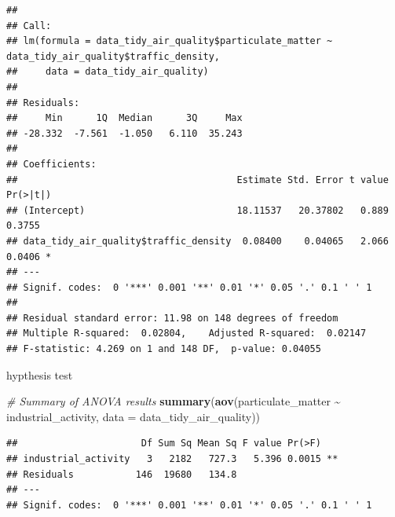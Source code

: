 \documentclass[12pt,halfline,a4paper,]{ouparticle}
\newenvironment{Shaded}{\begin{snugshade}}{\end{snugshade}}
\newcommand{\AttributeTok}[1]{\textcolor[rgb]{0.13,0.29,0.53}{#1}}
\newcommand{\CommentTok}[1]{\textcolor[rgb]{0.56,0.35,0.01}{\textit{#1}}}
\newcommand{\FunctionTok}[1]{\textcolor[rgb]{0.13,0.29,0.53}{\textbf{#1}}}
\newcommand{\NormalTok}[1]{#1}
\newcommand{\SpecialCharTok}[1]{\textcolor[rgb]{0.81,0.36,0.00}{\textbf{#1}}}
\begin{document}
\begin{verbatim}
## 
## Call:
## lm(formula = data_tidy_air_quality$particulate_matter ~ data_tidy_air_quality$traffic_density, 
##     data = data_tidy_air_quality)
## 
## Residuals:
##     Min      1Q  Median      3Q     Max 
## -28.332  -7.561  -1.050   6.110  35.243 
## 
## Coefficients:
##                                       Estimate Std. Error t value Pr(>|t|)  
## (Intercept)                           18.11537   20.37802   0.889   0.3755  
## data_tidy_air_quality$traffic_density  0.08400    0.04065   2.066   0.0406 *
## ---
## Signif. codes:  0 '***' 0.001 '**' 0.01 '*' 0.05 '.' 0.1 ' ' 1
## 
## Residual standard error: 11.98 on 148 degrees of freedom
## Multiple R-squared:  0.02804,    Adjusted R-squared:  0.02147 
## F-statistic: 4.269 on 1 and 148 DF,  p-value: 0.04055
\end{verbatim}

hypthesis test

\begin{Shaded}
\begin{Highlighting}[]
\CommentTok{\# Summary of ANOVA results}
\FunctionTok{summary}\NormalTok{(}\FunctionTok{aov}\NormalTok{(particulate\_matter }\SpecialCharTok{\textasciitilde{}}\NormalTok{ industrial\_activity, }\AttributeTok{data =}\NormalTok{ data\_tidy\_air\_quality))}
\end{Highlighting}
\end{Shaded}

\begin{verbatim}
##                      Df Sum Sq Mean Sq F value Pr(>F)   
## industrial_activity   3   2182   727.3   5.396 0.0015 **
## Residuals           146  19680   134.8                  
## ---
## Signif. codes:  0 '***' 0.001 '**' 0.01 '*' 0.05 '.' 0.1 ' ' 1
\end{verbatim}
\end{document}
